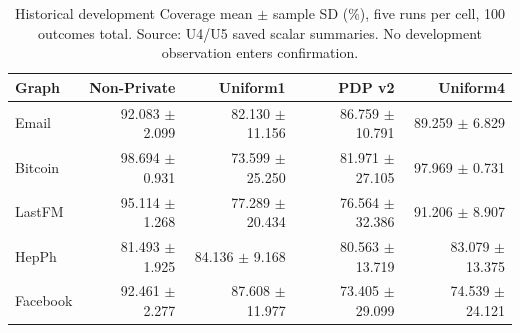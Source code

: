 \begin{table}[htbp]
\centering\small
\caption{Historical development Coverage mean $\pm$ sample SD (\%), five runs per cell, 100 outcomes total. Source: U4/U5 saved scalar summaries. No development observation enters confirmation.}\label{tab:development}
\begin{tabular}{lrrrr}\toprule
Graph & Non-Private & Uniform1 & PDP v2 & Uniform4\\\midrule
Email & 92.083 $\pm$ 2.099 & 82.130 $\pm$ 11.156 & 86.759 $\pm$ 10.791 & 89.259 $\pm$ 6.829 \\
Bitcoin & 98.694 $\pm$ 0.931 & 73.599 $\pm$ 25.250 & 81.971 $\pm$ 27.105 & 97.969 $\pm$ 0.731 \\
LastFM & 95.114 $\pm$ 1.268 & 77.289 $\pm$ 20.434 & 76.564 $\pm$ 32.386 & 91.206 $\pm$ 8.907 \\
HepPh & 81.493 $\pm$ 1.925 & 84.136 $\pm$ 9.168 & 80.563 $\pm$ 13.719 & 83.079 $\pm$ 13.375 \\
Facebook & 92.461 $\pm$ 2.277 & 87.608 $\pm$ 11.977 & 73.405 $\pm$ 29.099 & 74.539 $\pm$ 24.121 \\
\bottomrule\end{tabular}\end{table}
